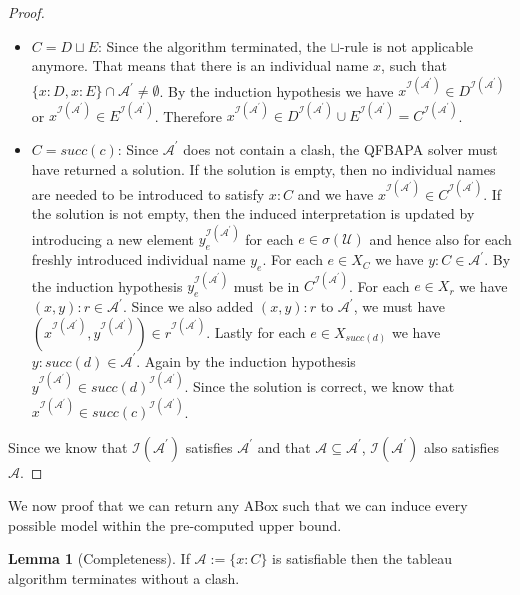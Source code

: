\documentclass{book}
\theoremstyle{break}
\theoremstyle{definition}
\newtheorem{mylem}{Lemma}
\begin{document}
\begin{proof}
\begin{itemize}
\item $C=D\sqcup E$: Since the algorithm terminated, the $\sqcup$-rule is not applicable anymore. That means that there is an individual name $x$, such that $\{x:D, x:E\}\cap \mathcal{A}^\prime\neq \emptyset$. By the induction hypothesis we have $x^{\mathcal{I}(\mathcal{A}^\prime)}\in D^{\mathcal{I}(\mathcal{A}^\prime)}$ or $x^{\mathcal{I}(\mathcal{A}^\prime)}\in E^{\mathcal{I}(\mathcal{A}^\prime)}$. Therefore $x^{\mathcal{I}(\mathcal{A}^\prime)}\in D^{\mathcal{I}(\mathcal{A}^\prime)}\cup E^{\mathcal{I}(\mathcal{A}^\prime)}=C^{\mathcal{I}(\mathcal{A}^\prime)}$.
\item $C=succ(c)$: Since $\mathcal{A}^\prime$ does not contain a clash, the QFBAPA solver must have returned a solution. If the solution is empty, then no individual names are needed to be introduced to satisfy $x:C$ and we have $x^{\mathcal{I}(\mathcal{A}^\prime)}\in C^{\mathcal{I}(\mathcal{A}^\prime)}$. If the solution is not empty, then the induced interpretation is updated by introducing a new element $y_e^{\mathcal{I}(\mathcal{A}^\prime)}$ for each $e\in \sigma(\mathcal{U})$ and hence also for each freshly introduced individual name $y_e$. For each $e\in X_C$ we have $y:C\in \mathcal{A}^\prime$. By the induction hypothesis $y_e^{\mathcal{I}(\mathcal{A}^\prime)}$ must be in $C^{\mathcal{I}(\mathcal{A}^\prime)}$. For each $e\in X_r$ we have $(x,y):r\in\mathcal{A}^\prime$. Since we also added $(x,y):r$ to $\mathcal{A}^\prime$, we must have $(x^{\mathcal{I}(\mathcal{A}^\prime)},y^{\mathcal{I}(\mathcal{A}^\prime)})\in r^{\mathcal{I}(\mathcal{A}^\prime)}$. Lastly for each $e\in X_{succ(d)}$ we have $y:succ(d)\in\mathcal{A}^\prime$. Again by the induction hypothesis $y^{\mathcal{I}(\mathcal{A}^\prime)}\in succ(d)^{\mathcal{I}(\mathcal{A}^\prime)}$. Since the solution is correct, we know that $x^{\mathcal{I}(\mathcal{A}^\prime)}\in succ(c)^{\mathcal{I}(\mathcal{A}^\prime)}$.
\end{itemize}
Since we know that $\mathcal{I}(\mathcal{A}^\prime)$ satisfies $\mathcal{A}^\prime$ and that $\mathcal{A}\subseteq \mathcal{A}^\prime$, $\mathcal{I}(\mathcal{A}^\prime)$ also satisfies $\mathcal{A}$.
\end{proof}
We now proof that we can return any ABox such that we can induce every possible model within the pre-computed upper bound.
\begin{mylem}[Completeness]
If $\mathcal{A}:=\{x:C\}$ is satisfiable then the tableau algorithm terminates without a clash.
\end{mylem}
\end{document}
